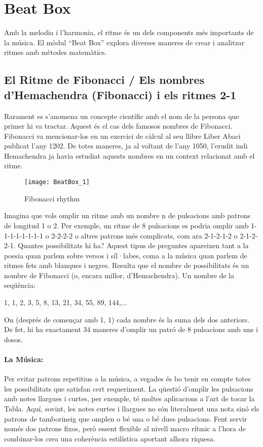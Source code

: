 \section{Beat Box}
Amb la melodia i l'harmonia, el ritme és un dels components més importants de la música. El mòdul ``Beat Box'' explora diverses maneres de crear i analitzar ritmes amb mètodes matemàtics.

\subsection{El Ritme de Fibonacci / Els nombres d'Hemachendra (Fibonacci) i els ritmes 2-1}

Rarament es s'anomena un concepte científic amb el nom de la persona que primer hi va tractar. Aquest és el cas dels famosos nombres de Fibonacci. Fibonacci va mencionar-los en un exercici de càlcul al seu llibre Liber Abaci publicat l'any 1202. De totes maneres, ja al voltant de l'any 1050, l'erudit indi Hemachendra ja havia estudiat aquests nombres en un context relacionat amb el ritme.

\begin{wrapfigure}[24]{l}{0.4\textwidth}
\centering
\texttt{[image: BeatBox\_1]}
\caption*{Fibonacci rhythm}
\end{wrapfigure}

Imagina que vols omplir un ritme amb un nombre n de pulsacions amb patrons de longitud 1 o 2. Per exemple, un ritme de 8 pulsacions es podria omplir amb 1-1-1-1-1-1-1-1 o 2-2-2-2 o altres patrons més complicats, com ara 2-1-2-1-2 o 2-1-2-2-1. Quantes possibilitats hi ha? Aquest tipus de preguntes apareixen tant a la poesia quan parlem sobre versos i síl·labes, coma a la música quan parlem de ritmes fets amb blanques i negres. Resulta que el nombre de possibilitats és un nombre de Fibonacci (o, encara millor, d'Hemachendra). Un nombre de la seqüència:
\begin{center}
1, 1, 2, 3, 5, 8, 13, 21, 34, 55, 89, 144,...
\end{center}
On (després de començar amb 1, 1) cada nombre és la suma dels dos anteriors. De fet, hi ha exactament 34 maneres d'omplir un patró de 8 pulsacions amb uns i dosos.

\paragraph{La Música:}
Per evitar patrons repetitius a la música, a vegades és bo tenir en compte totes les possibilitats que satisfan cert requeriment. La qüestió d'omplir les pulsacions amb notes llargues i curtes, per exemple, té moltes aplicacions a l'art de tocar la Tabla. Aquí, sovint, les notes curtes i llargues no són literalment una nota sinó els patrons de tamborineig que omplen o bé una o bé dues pulsacions. Fent servir només dos patrons fixos, però essent flexible al nivell macro rítmic a l'hora de combinar-los  crea una coherència estilística aportant alhora riquesa.

